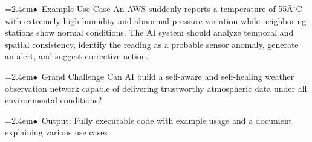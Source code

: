 \documentclass[10pt,a4paper]{article}
\begin{document}
\begin{tcolorbox}[pscard, title={"\textbf{SIH26073} \quad $\vert$ \quad AI/ML-Based Intelligent Anomaly Detection for Automatic Weather Stations (A...}]
\noindent\hspace*{1.2em}\hangindent=2.4em\textcolor{sihblue}{$\bullet$}~\small Example Use Case An AWS suddenly reports a temperature of 55Â$^\circ$C with extremely high humidity and abnormal pressure variation while neighboring stations show normal conditions. The AI system should analyze temporal and spatial consistency, identify the reading as a probable sensor anomaly, generate an alert, and suggest corrective action.\par\vspace{0.05cm}
\noindent\hspace*{1.2em}\hangindent=2.4em\textcolor{sihblue}{$\bullet$}~\small Grand Challenge Can AI build a self-aware and self-healing weather observation network capable of delivering trustworthy atmospheric data under all environmental conditions?\par\vspace{0.05cm}
\noindent\hspace*{1.2em}\hangindent=2.4em\textcolor{sihblue}{$\bullet$}~\small Output: Fully executable code with example usage and a document explaining various use cases\par\vspace{0.05cm}

\end{tcolorbox}
\vspace{0.4cm}
{}
\end{document}

